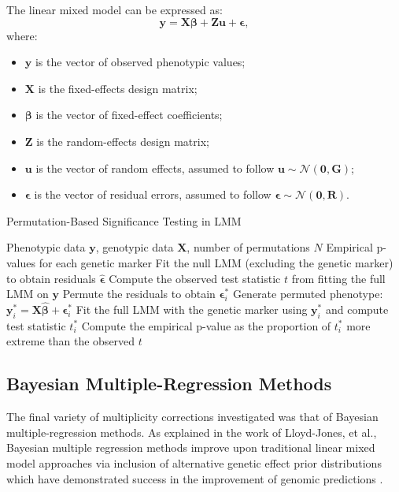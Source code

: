 \documentclass[12pt]{article}
\begin{document}
The linear mixed model can be expressed as:
\begin{equation}
    \mathbf{y} = \mathbf{X}\boldsymbol{\beta} + \mathbf{Z}\mathbf{u} + \boldsymbol{\epsilon},
\end{equation}
where:
\begin{itemize}
    \item $\mathbf{y}$ is the vector of observed phenotypic values;
    \item $\mathbf{X}$ is the fixed-effects design matrix;
    \item $\boldsymbol{\beta}$ is the vector of fixed-effect coefficients;
    \item $\mathbf{Z}$ is the random-effects design matrix;
    \item $\mathbf{u}$ is the vector of random effects, assumed to follow $\mathbf{u} \sim \mathcal{N}(\mathbf{0}, \mathbf{G})$;
    \item $\boldsymbol{\epsilon}$ is the vector of residual errors, assumed to follow $\boldsymbol{\epsilon} \sim \mathcal{N}(\mathbf{0}, \mathbf{R})$.
\end{itemize}

\vspace{1em}

\begin{algorithm}[H]
    \caption{Permutation-Based Significance Testing in LMM}
    \begin{algorithmic}[1]
        \Require Phenotypic data $\mathbf{y}$, genotypic data $\mathbf{X}$, number of permutations $N$
        \Ensure Empirical p-values for each genetic marker
        \State Fit the null LMM (excluding the genetic marker) to obtain residuals $\boldsymbol{\hat{\epsilon}}$
        \State Compute the observed test statistic $t$ from fitting the full LMM on $\mathbf{y}$
            \State Permute the residuals to obtain $\boldsymbol{\epsilon}^{*}_i$
            \State Generate permuted phenotype: $\mathbf{y}^{*}_i = \mathbf{X}\hat{\boldsymbol{\beta}} + \boldsymbol{\epsilon}^{*}_i$
            \State Fit the full LMM with the genetic marker using $\mathbf{y}^{*}_i$ and compute test statistic $t^{*}_i$
        \EndFor
        \State Compute the empirical p-value as the proportion of $t^{*}_i$ more extreme than the observed $t$
    \end{algorithmic}
\end{algorithm}


\subsection{Bayesian Multiple-Regression Methods}
The final variety of multiplicity corrections investigated was that of Bayesian multiple-regression methods. As explained in the work of Lloyd-Jones, et al., Bayesian multiple regression methods improve upon traditional linear mixed model approaches via inclusion of alternative genetic effect prior distributions which have demonstrated success in the improvement of genomic predictions \cite{LloydJones2019}. \par
\end{document}

